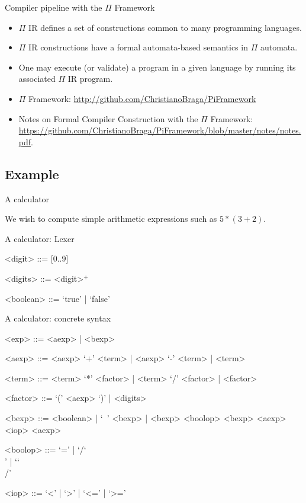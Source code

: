 \documentclass{beamer}
\newcommand{\BS}{\char`\\}
\begin{document}
\begin{frame}[allowframebreaks]{Compiler pipeline with the {\color{red}$\Pi$ Framework}}
\begin{itemize}
\item {\color{red}$\Pi$ IR} defines a set of constructions common to many programming languages.
\item {\color{red}$\Pi$ IR} constructions have a formal automata-based semantics in {\color{red}$\Pi$ automata}.
\item One may execute (or validate) a program in a given language by running its associated {\color{red}$\Pi$ IR} program. 

\newpage

\item {\color{red}$\Pi$ Framework}: \url{http://github.com/ChristianoBraga/PiFramework}
\item Notes on Formal Compiler Construction with the {\color{red}$\Pi$ Framework}: \url{https://github.com/ChristianoBraga/PiFramework/blob/master/notes/notes.pdf}.
\end{itemize}


\end{frame}

\subsection{Example}

\begin{frame}[fragile]{A calculator}

We wish to compute simple arithmetic expressions such as $ 5 * (3 + 2)$.

\end{frame}


\begin{frame}[fragile]{A calculator: Lexer}
\begin{grammar}
<digit> ::= [0..9]

<digits> ::= <digit>$^+$

<boolean> ::= `true' | `false'
\end{grammar}
\end{frame}


\begin{frame}[fragile]{A calculator: concrete syntax}
\begin{grammar}
<exp> ::= <aexp> | <bexp>

<aexp> ::= <aexp> `+' <term> | <aexp> `-' <term> | <term>

<term> ::= <term> `*' <factor> | <term> `/' <factor> | <factor>

<factor> ::= `(' <aexp> `)'  | <digits>

<bexp> ::= <boolean> | `~' <bexp> | <bexp> <boolop> <bexp> 
\alt <aexp> <iop> <aexp>

<boolop> ::= `=' | `/\BS' | `\BS/'

<iop> ::= `<' | `>' | `<=' | `>=' 
\end{grammar}
\end{frame}
\end{document}
